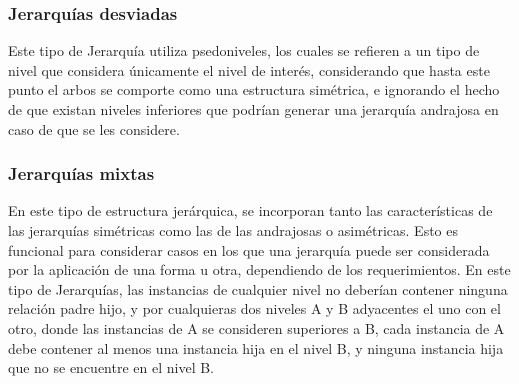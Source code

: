 \documentclass[DIV=calc, paper=a4, fontsize=11pt, twocolumn]{scrartcl}	 %
\begin{document}
\subsubsection*{Jerarqu\'{i}as desviadas}
Este tipo de Jerarqu\'{i}a utiliza psedoniveles, los cuales se refieren a un tipo de nivel que considera \'{u}nicamente el nivel de inter\'{e}s, considerando que hasta este punto el arbos se comporte como una estructura sim\'{e}trica, e ignorando el hecho de que existan niveles inferiores que podrían generar una jerarqu\'{i}a andrajosa en caso de que se les considere.

\subsubsection*{Jerarqu\'{i}as mixtas}
En este tipo de estructura jer\'{a}rquica, se incorporan tanto las caracter\'{i}sticas de las jerarqu\'{i}as sim\'{e}tricas como las de las andrajosas o asim\'{e}tricas. Esto es funcional para considerar casos en los que una jerarqu\'{i}a puede ser considerada por la aplicaci\'{o}n de una forma u otra, dependiendo de los requerimientos.
En este tipo de Jerarqu\'{i}as, las instancias de cualquier nivel no deber\'{i}an contener ninguna relaci\'{o}n padre hijo, y por cualquieras dos niveles A y B adyacentes el uno con el otro, donde las instancias de A se consideren superiores a B, cada instancia de A debe contener al menos una instancia hija en el nivel B,  y ninguna instancia hija que no se encuentre en el nivel B.





\end{document}
